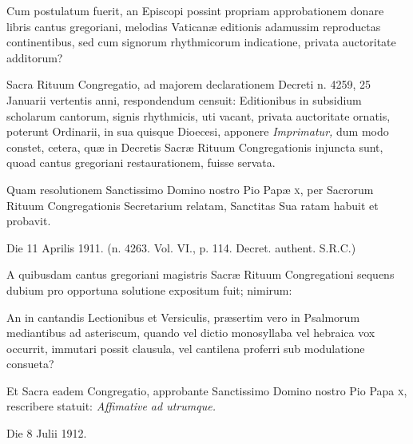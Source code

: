 \documentclass[vesperale_romanum.tex]{subfiles}
\begin{document}
\myrule

{\centering{}\par} %

{}

Cum postulatum fuerit, an Episcopi possint propriam approbationem donare libris cantus gregoriani, melodias Vaticanæ editionis adamussim reprodu\-ctas continentibus, sed cum signorum rhythmicorum indicatione, privata au\-ctoritate additorum?

Sacra Rituum Congregatio, ad majorem declarationem Decreti n. 4259, 25 Januarii vertentis anni, respondendum censuit:
Editionibus in subsidium scholarum cantorum, signis rhythmicis, uti vacant, privata au\-ctoritate ornatis, poterunt Ordinarii, in sua quisque Dioecesi, apponere \textit{Imprimatur,} dum modo constet, cetera, quæ in Decretis Sacræ Rituum Congregationis injun\-cta sunt, quoad cantus gregoriani restaurationem, fuisse servata.

Quam resolutionem San\-ctissimo Domino nostro Pio Papæ \textsc{x}, per Sacrorum Rituum Congregationis Secretarium relatam, San\-ctitas Sua ratam habuit et probavit.

Die 11 Aprilis 1911. {\hfill(n. 4263. Vol. VI., p. 114. Decret. authent. S.R.C.)}
\vspace{5ex}%

{\centering{}\par} %

{}

A quibusdam cantus gregoriani magistris Sacræ Rituum Congregationi sequens dubium pro opportuna solutione expositum fuit; nimirum:

An in cantandis Le\-ctionibus et Versiculis, præsertim vero in Psalmorum mediantibus ad asteriscum, quando vel di\-ctio monosyllaba vel hebraica vox occurrit, immutari possit clausula, vel cantilena proferri sub modulatione consueta?

Et Sacra eadem Congregatio, approbante San\-ctissimo Domino nostro Pio Papa \textsc{x}, rescribere statuit: \textit{Affimative ad utrumque.}

Die 8 Julii 1912.
\end{document}
